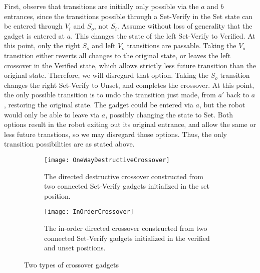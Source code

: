 First, observe that transitions are initially only possible via the $a$ and $b$ entrances, since the transitions possible through a Set-Verify in the Set state can be entered through $V_i$ and $S_o$, not $S_i$. Assume without loss of generality that the gadget is entered at $a$. This changes the state of the left Set-Verify to Verified. At this point, only the right $S_o$ and left $V_o$ transitions are passable. Taking the $V_o$ transition either reverts all changes to the original state, or leaves the left crossover in the Verified state, which allows strictly less future transition than the original state. Therefore, we will disregard that option. Taking the $S_o$ transition changes the right Set-Verify to Unset, and completes the crossover. At this point, the only possible transition is to undo the transition just made, from $a'$ back to $a$, restoring the original state. The gadget could be entered via $a$, but the robot would only be able to leave via $a$, possibly changing the state to Set. Both options result in the robot exiting out its original entrance, and allow the same or less future transtions, so we may disregard those options. Thus, the only transition possibilities are as stated above.

\begin{figure}[!ht]
  \centering
  \begin{subfigure}[b]{0.47\textwidth}
    \texttt{[image: OneWayDestructiveCrossover]}
    \caption{The directed destructive crossover constructed from two connected Set-Verify gadgets initialized in the set position.}
    \label{DestructiveCrossover}
  \end{subfigure}
  \hfill
  \begin{subfigure}[b]{0.47\textwidth}
    \texttt{[image: InOrderCrossover]}
    \caption{The in-order directed crossover constructed from two connected Set-Verify gadgets initialized in the verified and unset positions.}
    \label{InOrderCrossover}
  \end{subfigure}
  \caption{Two types of crossover gadgets}
\end{figure}




